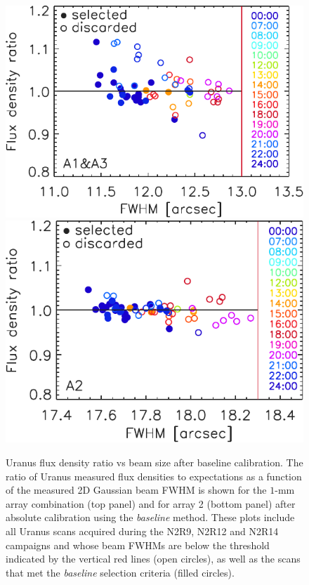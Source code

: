 \documentclass[traditionalabstract]{aa}
\begin{document}
\begin{figure}[!htbp]
\begin{center}
\includegraphics[clip=true, trim={0, -0.3cm, -0.3cm, 0}, width=0.72\linewidth]{Figures/plot_flux_density_ratio_fwhm_uranus_corrected_skydip_narrow_1mm.pdf}
\includegraphics[clip=true, trim={0cm, -0.3cm, -0.6cm, 0}, width=0.707\linewidth]{Figures/plot_flux_density_ratio_fwhm_uranus_corrected_skydip_narrow_a2.pdf}
\caption[Uranus flux density stability against FWHM]{ Uranus flux
density ratio vs beam size after baseline calibration. The ratio
of Uranus measured flux densities to expectations as a function of the
measured 2D Gaussian beam FWHM is shown for the $1$-mm array
combination (top panel) and for array 2 (bottom panel) after absolute calibration using the
\emph{baseline} method. These plots include all Uranus scans acquired during the 
N2R9, N2R12 and N2R14 campaigns and whose beam FWHMs are below the threshold indicated
by the vertical red lines (open circles), as well as the scans that
met the \emph{baseline} selection criteria (filled circles).}
\label{fig:calib_uranus_vs_fwhm_all}
\end{center}
\end{figure}
\end{document}
